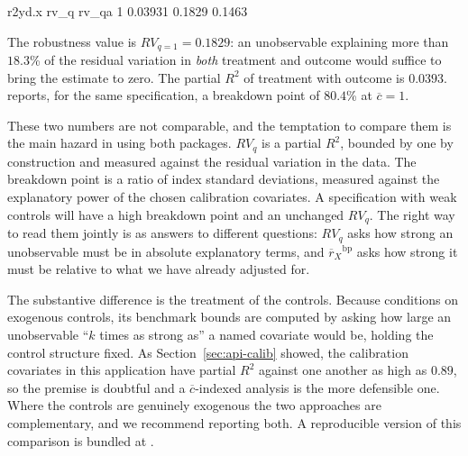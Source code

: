 \documentclass[article]{jss}\usepackage[]{graphicx}\usepackage[]{xcolor}
\newcommand{\rxbar}{\ensuremath{\overline{r}_X}}
\newcommand{\cbar}{\ensuremath{\overline{c}}}
\begin{document}
\begin{Schunk}
\begin{Soutput}
   r2yd.x   rv_q  rv_qa
1 0.03931 0.1829 0.1463
\end{Soutput}
\end{Schunk}



The robustness value is $RV_{q=1} = 0.1829$: an unobservable
explaining more than $18.3$\% of the residual variation in
\emph{both} treatment and outcome would suffice to bring the estimate to
zero. The partial $R^2$ of treatment with outcome is
$0.0393$.  reports, for the same
specification, a breakdown point of $80.4$\% at
$\cbar = 1$.

These two numbers are not comparable, and the temptation to compare them is
the main hazard in using both packages. $RV_q$ is a partial $R^2$, bounded
by one by construction and measured against the residual variation in the
data. The breakdown point is a ratio of index standard deviations, measured
against the explanatory power of the chosen calibration covariates. A
specification with weak controls will have a high breakdown point and an
unchanged $RV_q$. The right way to read them jointly is as answers to
different questions: $RV_q$ asks how strong an unobservable must be in
absolute explanatory terms, and $\rxbar^{}$ asks how strong it
must be relative to what we have already adjusted for.

The substantive difference is the treatment of the controls. Because
 conditions on exogenous controls, its benchmark bounds
are computed by asking how large an unobservable ``$k$ times as strong as''
a named covariate would be, holding the control structure fixed. As
Section~\ref{sec:api-calib} showed, the calibration covariates in this
application have partial $R^2$ against one another as high as $0.89$, so
the premise is doubtful and a $\cbar$-indexed analysis is the more
defensible one. Where the controls are genuinely exogenous the two
approaches are complementary, and we recommend reporting both. A
reproducible version of this comparison is bundled at
.
\end{document}
